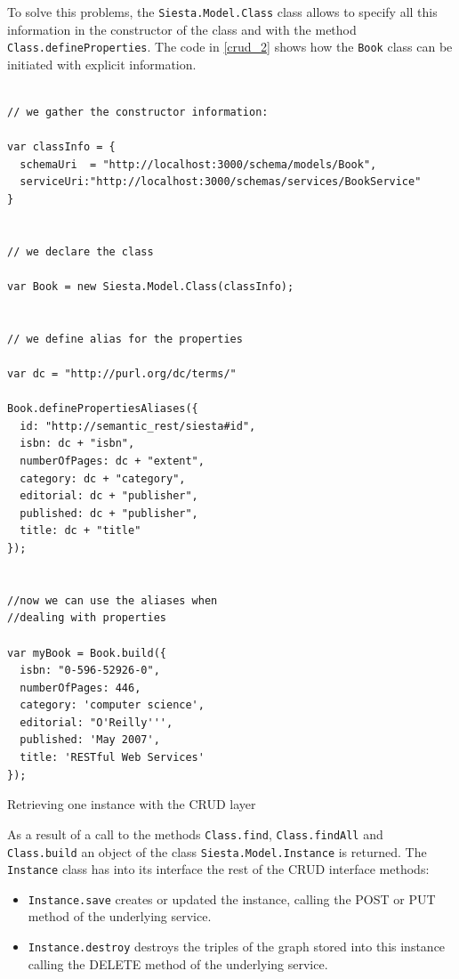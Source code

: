 To solve this problems, the \texttt{Siesta.Model.Class} class allows to specify all this information in the constructor
of the class and with the method \texttt{Class.defineProperties}. The code in \ref{crud_2} shows how the \texttt{Book}
class can be initiated with explicit information.

\begin{table}
\vspace{5 mm}
\begin{lstlisting}

// we gather the constructor information:

var classInfo = {
  schemaUri  = "http://localhost:3000/schema/models/Book",
  serviceUri:"http://localhost:3000/schemas/services/BookService"
}


// we declare the class

var Book = new Siesta.Model.Class(classInfo);


// we define alias for the properties

var dc = "http://purl.org/dc/terms/"

Book.definePropertiesAliases({
  id: "http://semantic_rest/siesta#id",
  isbn: dc + "isbn",
  numberOfPages: dc + "extent",
  category: dc + "category",
  editorial: dc + "publisher",
  published: dc + "publisher",
  title: dc + "title"
});


//now we can use the aliases when 
//dealing with properties

var myBook = Book.build({
  isbn: "0-596-52926-0",
  numberOfPages: 446,
  category: 'computer science',
  editorial: "O'Reilly''',
  published: 'May 2007',
  title: 'RESTful Web Services'
});

\end{lstlisting} 
\vspace{5 mm}
\caption{Retrieving one instance with the CRUD layer}
\label{crud_2}
\end{table}

As a result of a call to the methods \texttt{Class.find}, \texttt{Class.findAll} and \texttt{Class.build} an object of
the class \texttt{Siesta.Model.Instance} is returned. The \texttt{Instance} class has into its interface the rest of the
CRUD interface methods:

\begin{itemize}
\item \texttt{Instance.save} creates or updated the instance, calling the POST or PUT method of the underlying service.
\item \texttt{Instance.destroy} destroys the triples of the graph stored into this instance calling the DELETE method of
  the underlying service.
\end{itemize}

